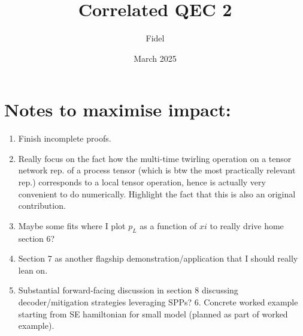 \documentclass{article}
\title{Correlated QEC 2}
\author{Fidel}
\date{March 2025}
\begin{document}
\maketitle

\section{Notes to maximise impact:}
\begin{enumerate}
    \item Finish incomplete proofs. 

    \item Really focus on the fact how the multi-time twirling operation on a tensor network rep. of a process tensor (which is btw the most practically relevant rep.) corresponds to a local tensor operation, hence is actually very convenient to do numerically. Highlight the fact that this is also an original contribution.

    \item Maybe some fits where I plot \(p_L\) as a function of \(xi\) to really drive home section 6?

    \item Section 7 as another flagship demonstration/application that I should really lean on. 

    \item Substantial forward-facing discussion in section 8 discussing decoder/mitigation strategies leveraging SPPs? 6. Concrete worked example starting from SE hamiltonian for small model (planned as part of worked example).
\end{enumerate}
\end{document}
